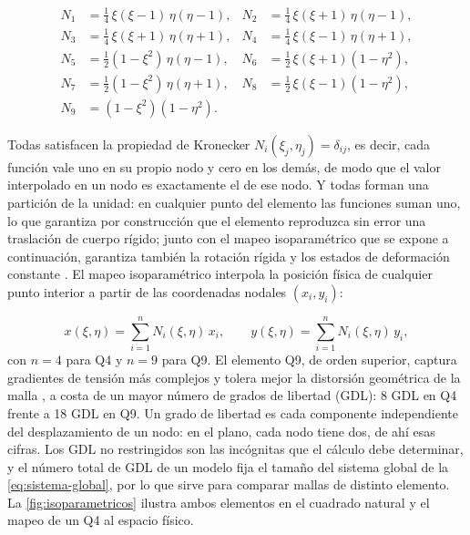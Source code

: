 \begin{equation}
\begin{aligned}
N_1 &= \tfrac{1}{4}\,\xi(\xi-1)\,\eta(\eta-1), & N_2 &= \tfrac{1}{4}\,\xi(\xi+1)\,\eta(\eta-1), \\
N_3 &= \tfrac{1}{4}\,\xi(\xi+1)\,\eta(\eta+1), & N_4 &= \tfrac{1}{4}\,\xi(\xi-1)\,\eta(\eta+1), \\
N_5 &= \tfrac{1}{2}(1-\xi^2)\,\eta(\eta-1), & N_6 &= \tfrac{1}{2}\,\xi(\xi+1)(1-\eta^2), \\
N_7 &= \tfrac{1}{2}(1-\xi^2)\,\eta(\eta+1), & N_8 &= \tfrac{1}{2}\,\xi(\xi-1)(1-\eta^2), \\
N_9 &= (1-\xi^2)(1-\eta^2). &&
\end{aligned}
\label{eq:N-q9}
\end{equation}

Todas satisfacen la propiedad de Kronecker $N_i(\xi_j, \eta_j) = \delta_{ij}$, es decir, cada función vale uno en su propio nodo y cero en los demás, de modo que el valor interpolado en un nodo es exactamente el de ese nodo. Y todas forman una partición de la unidad: en cualquier punto del elemento las funciones suman uno, lo que garantiza por construcción que el elemento reproduzca sin error una traslación de cuerpo rígido; junto con el mapeo isoparamétrico que se expone a continuación, garantiza también la rotación rígida y los estados de deformación constante \autocite[p.~237]{cook2002concepts}. El mapeo isoparamétrico interpola la posición física de cualquier punto interior a partir de las coordenadas nodales $(x_i, y_i)$:

\begin{equation}
x(\xi, \eta) = \sum_{i=1}^{n} N_i(\xi, \eta)\,x_i, \qquad
y(\xi, \eta) = \sum_{i=1}^{n} N_i(\xi, \eta)\,y_i,
\label{eq:mapeo-iso}
\end{equation}
con $n = 4$ para Q4 y $n = 9$ para Q9. El elemento Q9, de orden superior, captura gradientes de tensión más complejos y tolera mejor la distorsión geométrica de la malla \autocite[pp.~235-236]{cook2002concepts}, a costa de un mayor número de grados de libertad (GDL): 8 GDL en Q4 frente a 18 GDL en Q9. Un grado de libertad es cada componente independiente del desplazamiento de un nodo: en el plano, cada nodo tiene dos, de ahí esas cifras. Los GDL no restringidos son las incógnitas que el cálculo debe determinar, y el número total de GDL de un modelo fija el tamaño del sistema global de la \autoref{eq:sistema-global}, por lo que sirve para comparar mallas de distinto elemento. La \autoref{fig:isoparametricos} ilustra ambos elementos en el cuadrado natural y el mapeo de un Q4 al espacio físico.

